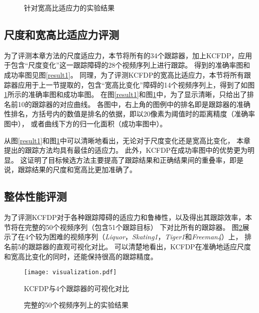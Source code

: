 \begin{figure}[htb]
  \centering
  \hspace{-2.45cm}
  \newline
  \caption{针对宽高比适应力的实验结果}
  \label{result2}
\end{figure}

\subsection{尺度和宽高比适应力评测}
为了评测本章方法的尺度适应力，本节将所有的34个跟踪器，加上KCFDP，应用于包含``尺度变化''这一跟踪障碍的28个视频序列上进行跟踪。
得到的准确率图和成功率图见图\ref{result1}。
同理，为了评测KCFDP的宽高比适应力，本节将所有跟踪器应用于上一节提取的，包含``宽高比变化''障碍的14个视频序列上，得到了如图\ref{result2}所示的准确率图和成功率图。
在图\ref{result1}和图\ref{result2}中，为了显示清晰，只给出了排名前10的跟踪器的对应曲线。
各图中，右上角的图例中的排名即是跟踪器的准确性排名，方括号内的数值是排名的依据，即以20像素为阈值时的距离精度（准确率图中），
或者曲线下方的归一化面积（成功率图中）。

从图\ref{result1}和图\ref{result2}中可以清晰地看出，无论对于尺度变化还是宽高比变化，
本章提出的跟踪方法均具有最佳的适应力。
此外，KCFDP在成功率图中的优势更为明显。
这证明了目标候选方法主要提高了跟踪结果和正确结果间的重叠率，即是说，跟踪结果的尺度和宽高比更加准确了。

\subsection{整体性能评测}
为了评测KCFDP对于各种跟踪障碍的适应力和鲁棒性，以及得出其跟踪效率，本节将在完整的50个视频序列（包含51个跟踪目标）
下对比所有的跟踪器。
图\ref{visualization}展示了在4个较为困难的视频序列（\textit{Liquor}，\textit{Skating1}，\textit{Tiger1}和\textit{Freeman4}）上，
排名前5的跟踪器的直观可视化对比。
可以清楚地看出，KCFDP在准确地适应尺度和宽高比变化的同时，还能保持很高的跟踪精度。

\begin{figure}
	\centering
		\texttt{[image: visualization.pdf]}
	\caption{KCFDP与4个跟踪器的可视化对比}
	\label{visualization}
\end{figure}

\begin{figure}[htb]
  \centering
  \hspace{-2.2cm}
  \newline
  \caption{完整的50个视频序列上的实验结果}
  \label{result3}
\end{figure}

